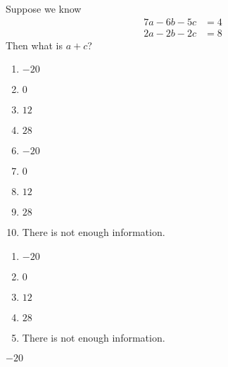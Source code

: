 


  Suppose we know
\begin{align*}
7a - 6b - 5c & = 4 \\
2a - 2b - 2c & = 8
\end{align*}
Then what is $a + c$?


\ifsat
	\begin{enumerate}[label=\Alph*)]
		\item   $-20$ %
		\item  $0$
		\item  $12$
		\item  $28$
	\end{enumerate}
\else
\fi

\ifacteven
	\begin{enumerate}[label=\textbf{\Alph*.},itemsep=\fill,align=left]
		\setcounter{enumii}{5}
		\item   $-20$ %
		\item  $0$
		\item  $12$
		\addtocounter{enumii}{1}
		\item  $28$
		\item There is not enough information.
	\end{enumerate}
\else
\fi

\ifactodd
	\begin{enumerate}[label=\textbf{\Alph*.},itemsep=\fill,align=left]
		\item   $-20$ %
		\item  $0$
		\item  $12$
		\item  $28$
		\item There is not enough information.
	\end{enumerate}
\else
\fi

\ifgridin
   $-20$ %
		
\else
\fi

